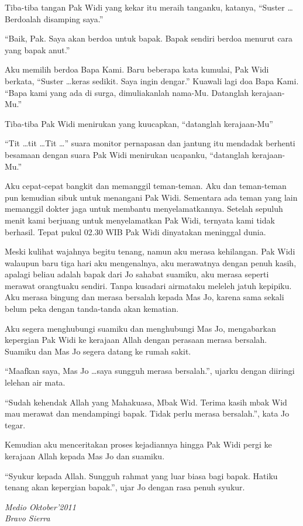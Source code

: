 Tiba-tiba tangan Pak Widi yang kekar itu meraih tanganku, katanya, ``Suster \ldots Berdoalah disamping saya.''

``Baik, Pak. Saya akan berdoa untuk bapak. Bapak sendiri berdoa menurut cara yang bapak anut.'' 

Aku memilih berdoa Bapa Kami. Baru beberapa kata kumulai, Pak Widi berkata, ``Suster \dots keras sedikit. Saya ingin dengar.''
Kuawali lagi doa Bapa Kami. ``Bapa kami yang ada di surga, dimuliakanlah nama-Mu. Datanglah kerajaan-Mu.''

Tiba-tiba Pak Widi menirukan yang kuucapkan, ``datanglah kerajaan-Mu''

``Tit \ldots tit \ldots Tit \ldots '' suara monitor pernapasan dan jantung itu mendadak berhenti besamaan dengan suara Pak Widi menirukan ucapanku, ``datanglah kerajaan-Mu.''

Aku cepat-cepat bangkit dan memanggil teman-teman. Aku dan teman-teman pun kemudian sibuk untuk menangani Pak Widi. Sementara ada teman yang lain memanggil dokter jaga untuk membantu menyelamatkannya. Setelah sepuluh menit kami berjuang untuk menyelamatkan Pak Widi, ternyata kami tidak berhasil. Tepat pukul 02.30 WIB Pak Widi dinyatakan meninggal dunia.

Meski kulihat wajahnya begitu tenang, namun aku merasa kehilangan. Pak Widi walaupun baru tiga hari aku mengenalnya, aku merawatnya dengan penuh kasih, apalagi beliau adalah bapak dari Jo sahabat suamiku, aku merasa seperti merawat orangtuaku sendiri. Tanpa kusadari airmataku meleleh jatuh kepipiku. Aku merasa bingung dan merasa bersalah kepada Mas Jo, karena sama sekali belum peka dengan tanda-tanda akan kematian.

Aku segera menghubungi suamiku dan menghubungi Mas Jo, mengabarkan kepergian Pak Widi ke kerajaan Allah dengan perasaan merasa bersalah. Suamiku dan Mas Jo segera datang ke rumah sakit.

``Maafkan saya, Mas Jo \ldots saya sungguh merasa bersalah.'', ujarku dengan diiringi lelehan air mata.

``Sudah kehendak Allah yang Mahakuasa, Mbak Wid. Terima kasih mbak Wid  mau merawat dan mendampingi  bapak. Tidak perlu merasa bersalah.'', kata Jo tegar. 

Kemudian aku menceritakan proses kejadiannya hingga Pak Widi pergi ke kerajaan Allah kepada Mas Jo dan suamiku.

``Syukur kepada Allah. Sungguh rahmat yang luar biasa bagi bapak. Hatiku tenang akan kepergian bapak.'', ujar Jo dengan rasa penuh syukur. 

\begin{flushright}
\textit{Medio Oktober’2011 \\Bravo Sierra}
\end{flushright}
\normalsize